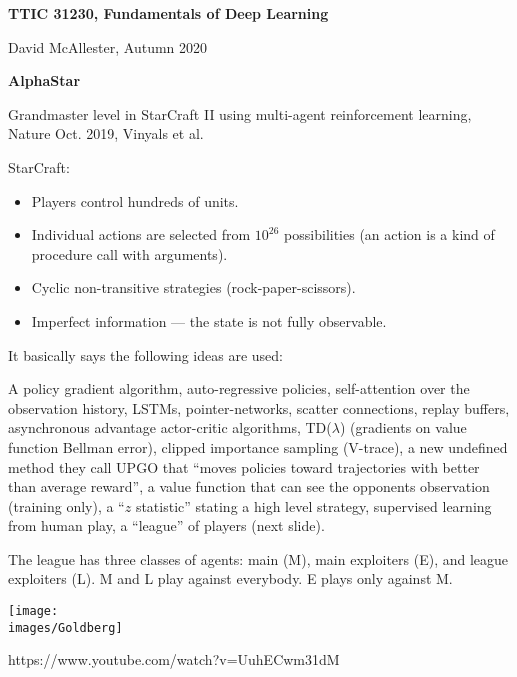 




{\Huge

  \centerline{\bf TTIC 31230, Fundamentals of Deep Learning}
  \bigskip
  \centerline{David McAllester, Autumn 2020}

  \vfill
  \centerline{\bf AlphaStar}
  \vfill
  \vfill


Grandmaster level in StarCraft II using multi-agent reinforcement learning, Nature Oct. 2019, Vinyals et al.

\vfill
StarCraft:

\begin{itemize}
\item Players control hundreds of units.

\vfill
\item Individual actions are selected from $10^{26}$ possibilities (an action is a kind of procedure call with arguments).

\vfill
\item Cyclic non-transitive strategies (rock-paper-scissors).

\vfill
\item Imperfect information --- the state is not fully observable.
\end{itemize}


It basically says the following ideas are used:

A policy gradient algorithm, auto-regressive policies, self-attention over the observation history, LSTMs, pointer-networks, scatter connections,
replay buffers, asynchronous advantage actor-critic algorithms, TD($\lambda$) (gradients on value function Bellman error), clipped importance sampling
(V-trace), a new undefined method they call UPGO that ``moves policies toward trajectories with better than average reward'', a value function
that can see the opponents observation (training only), a ``$z$ statistic'' stating a high level strategy, 
supervised learning from human play, 
a ``league'' of players (next slide).


The league has three classes of agents: main (M), main exploiters (E), and league exploiters (L).  M and L play against everybody.
E plays only against M.


\centerline{\texttt{[image: \\images/Goldberg]}}


https://www.youtube.com/watch?v=UuhECwm31dM




}

